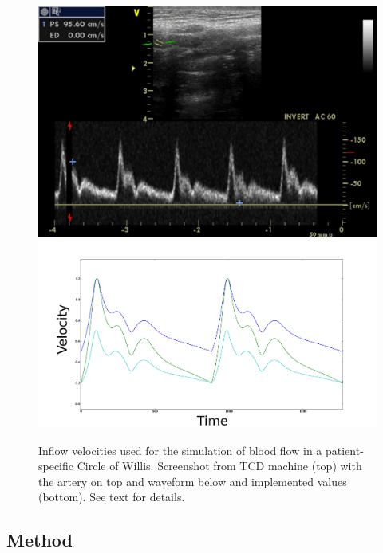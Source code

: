\begin{figure}
\bwfig
  \centering
  \includegraphics[width=\largefig]{chapters/kvs-2/pdf/ica.pdf} \\
  \includegraphics[width=\largefig]{chapters/kvs-2/pdf/cok_inflow.pdf}
  \caption{Inflow velocities used for the simulation of blood flow in
    a patient-specific Circle of Willis. Screenshot from TCD machine
    (top) with the artery on top and waveform below and implemented
    values (bottom). See text for details.}
  \label{fig:kvs-2:cok_inflow}
\end{figure}

\subsection{Method}

